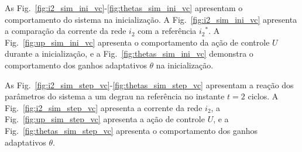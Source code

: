 
  As Fig.~\ref{fig:i2_sim_ini_vc}-\ref{fig:thetas_sim_ini_vc} apresentam o comportamento do sistema na inicialização. A Fig.~\ref{fig:i2_sim_ini_vc} apresenta a comparação da corrente da rede $i_2$ com a referência ${i_2}^*$. A Fig.~\ref{fig:up_sim_ini_vc} apresenta o comportamento da ação de controle $U$ durante a inicialização, e a Fig.~\ref{fig:thetas_sim_ini_vc} demonstra o comportamento dos ganhos adaptativos $\theta$ na inicialização.

  \newpage

  \vspace*{\fill}
  \noindent
  \begin{minipage}{\textwidth}
    \makebox[\textwidth]{
      \centering
      \def\svgwidth{\textwidth}
      }
    \label{fig:i2_sim_ini_vc}
  \end{minipage}
  \vspace*{\fill}

  \newpage

  \vfill
  \noindent
  \begin{minipage}{0.9\textwidth}
    \makebox[\textwidth]{
      \centering
      \def\svgwidth{\textwidth}
      }
    \label{fig:up_sim_ini_vc}
  \end{minipage}

  \vfill
  \noindent
  \begin{minipage}{0.9\textwidth}
    \makebox[\textwidth]{
      \centering
      \def\svgwidth{\textwidth}
      }
    \label{fig:thetas_sim_ini_vc}
  \end{minipage}
  \vfill

  \newpage

  As Fig.~\ref{fig:i2_sim_step_vc}-\ref{fig:thetas_sim_step_vc} apresentam a reação dos parâmetros do sistema a um degrau na referência no instante $t=2$ ciclos. A Fig.~\ref{fig:i2_sim_step_vc} apresenta a corrente da rede $i_2$, a Fig.~\ref{fig:up_sim_step_vc} apresenta a ação de controle $U$, e a Fig.~\ref{fig:thetas_sim_step_vc} apresenta o comportamento dos ganhos adaptativos $\theta$.


